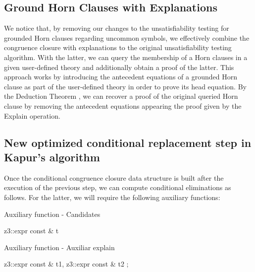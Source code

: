 \subsection{Ground Horn Clauses with Explanations}

We notice that, by removing our changes to the unsatisfiability testing
for grounded Horn clauses regarding uncommon symbols, we effectively combine
the congruence closure with explanations to the original unsatisfiability
testing algorithm. With the latter, we can query the membership of a Horn
clauses in a given user-defined theory and additionally obtain a proof of
the latter. This approach works by introducing the antecedent equations of
a grounded Horn clause as part of the user-defined theory in order to prove
its head equation. By the Deduction Theorem \cite{10.5555/1642730}, we can
recover a proof of the original queried Horn clause by removing the antecedent
equations appearing the proof given by the Explain operation.

\subsection{New optimized conditional replacement step in Kapur's algorithm}

Once the conditional congruence closure data structure is built after 
the execution of the previous step, we can compute conditional eliminations
as follows. For the latter, we will require the following auxiliary functions:

\begin{algorithm}
  \caption{Auxiliary function - Candidates}
  \linespread{\separationline}\selectfont
  \begin{algorithmic}[2]
     {z3::expr const \& t}
    \Else
    \EndIf
    \EndProcedure
  \end{algorithmic}
\end{algorithm}

\begin{algorithm}
  \caption{Auxiliary function - Auxiliar explain}
  \linespread{\separationline}\selectfont
  \begin{algorithmic}[2]
     {z3::expr const \& t1, z3::expr const \& t2}
    \EndIf
    \Else
    ;
    \EndIf
    \Else
    \EndFor
    \EndIf
    \EndIf
    \EndFor
    \EndProcedure
  \end{algorithmic}
\end{algorithm}

